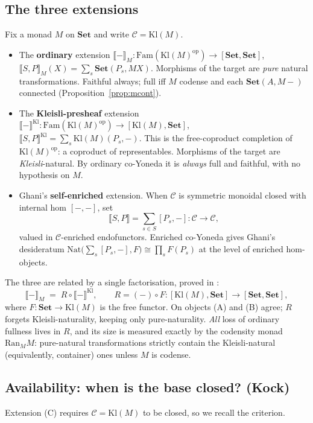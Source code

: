 \documentclass[11pt]{amsart}
\theoremstyle{plain}
\theoremstyle{definition}
\theoremstyle{remark}
\newcommand{\Set}{\mathbf{Set}}
\newcommand{\Fam}{\mathrm{Fam}}
\newcommand{\Kl}{\mathrm{Kl}}
\newcommand{\Nat}{\mathrm{Nat}}
\newcommand{\Ran}{\mathrm{Ran}}
\newcommand{\op}{\mathrm{op}}
\newcommand{\ext}[1]{\llbracket #1 \rrbracket}
\newcommand{\extM}[1]{\llbracket #1 \rrbracket_{M}}
\newcommand{\extKl}[1]{\llbracket #1 \rrbracket^{\Kl}}
\newcommand{\C}{\mathcal{C}}
\begin{document}
\subsection{The three extensions}\label{ssec:three}
Fix a monad $M$ on $\Set$ and write $\C=\Kl(M)$.
\begin{itemize}[leftmargin=1.8em]
  \item[\textbf{(A)}] The \textbf{ordinary} extension
    $\extM{-}\colon \Fam(\Kl(M)^{\op})\to[\Set,\Set]$, $\extM{S,P}(X)=\sum_s\Set(P_s,MX)$. Morphisms of
    the target are \emph{pure} natural transformations. Faithful always; full iff $M$ codense and each
    $\Set(A,M-)$ connected (Proposition~\ref{prop:mcont}).
  \item[\textbf{(B)}] The \textbf{Kleisli-presheaf} extension
    $\extKl{-}\colon\Fam(\Kl(M)^{\op})\to[\Kl(M),\Set]$, $\extKl{S,P}=\sum_s\Kl(M)(P_s,-)$. This is the
    free-coproduct completion of $\Kl(M)^{\op}$: a coproduct of representables. Morphisms of the
    target are \emph{Kleisli}-natural. By ordinary co-Yoneda it is \emph{always} full and faithful,
    with no hypothesis on $M$.
  \item[\textbf{(C)}] Ghani's \textbf{self-enriched} extension. When $\C$ is symmetric monoidal
    closed with internal hom $[-,-]$, set
    \[
      \ext{S,P}=\sum_{s\in S}[P_s,-]\colon\C\longrightarrow\C,
    \]
    valued in $\C$-enriched endofunctors. Enriched co-Yoneda \cite{Kelly} gives Ghani's desideratum
    $\Nat\big(\sum_s[P_s,-],F\big)\cong\prod_s F(P_s)$ at the level of enriched hom-objects.
\end{itemize}
The three are related by a single factorisation, proved in \cite{MacBethCodensity}:
\[
  \extM{-}\;=\;R\circ\extKl{-},\qquad R=(-)\circ F\colon [\Kl(M),\Set]\to[\Set,\Set],
\]
where $F\colon\Set\to\Kl(M)$ is the free functor. On objects (A) and (B) agree; $R$ forgets
Kleisli-naturality, keeping only pure-naturality. \emph{All} loss of ordinary fullness lives in $R$,
and its size is measured exactly by the codensity monad $\Ran_M M$: pure-natural transformations
strictly contain the Kleisli-natural (equivalently, container) ones unless $M$ is codense.

\subsection{Availability: when is the base closed? (Kock)}\label{ssec:kock}
Extension (C) requires $\C=\Kl(M)$ to be closed, so we recall the criterion.
\end{document}
